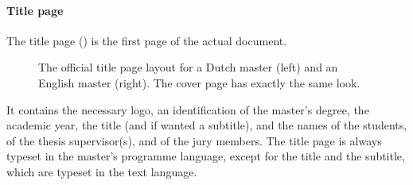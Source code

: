 \documentclass[11pt,article,oneside,british,extralanguage=dutch]{kulemt}
\begin{document}
\paragraph{Title page} The title page () is the first page
of the actual document.
\begin{figure}
  \centering \fboxsep=0pt
  \qquad
  \caption{The official title page layout for a Dutch master (left) and an
    English master (right). The cover page has exactly the same look.}
  \label{fig:titlepage}
\end{figure}
It contains the necessary logo, an identification of the master's degree, the
academic year, the title (and if wanted a subtitle), and the names of the
students, of the thesis supervisor(s), and of the jury members. The title page
is always typeset in the master's programme language, except for the title and
the subtitle, which are typeset in the text language.
\end{document}
